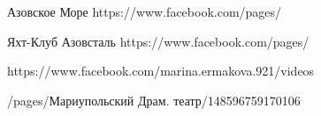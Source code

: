  
 
 
 
 

Азовское Море
https://www.facebook.com/pages/%

Яхт-Клуб Азовсталь
https://www.facebook.com/pages/%

https://www.facebook.com/marina.ermakova.921/videos


/pages/Мариупольский Драм. театр/148596759170106
